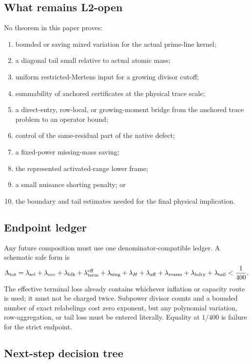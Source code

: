 \subsection{What remains L2-open}

No theorem in this paper proves:
\begin{enumerate}[label=\textup{(\arabic*)}]
 \item bounded or saving mixed variation for the actual prime-line kernel;
 \item a diagonal tail small relative to actual atomic mass;
 \item uniform restricted-Mertens input for a growing divisor cutoff;
 \item summability of anchored certificates at the physical trace scale;
 \item a direct-entry, row-local, or growing-moment bridge from the
 anchored trace problem to an operator bound;
 \item control of the same-residual part of the native defect;
 \item a fixed-power missing-mass saving;
 \item the represented activated-range lower frame;
 \item a small nuisance shorting penalty; or
 \item the boundary and tail estimates needed for the final physical
 implication.
\end{enumerate}

\subsection{Endpoint ledger}

Any future composition must use one denominator-compatible ledger.  A
schematic safe form is
\[
 \Lambda_{\rm tot}
 =
 \lambda_{\rm sel}+\lambda_{\rm occ}+\lambda_{\rm blk}
 +\lambda_{\rm term}^{\rm eff}
 +\lambda_{\rm sing}+\lambda_H+\lambda_{\rm aff}
 +\lambda_{\rm reasm}+\lambda_{\rm bdry}+\lambda_{\rm tail}
 <\frac1{400}.
\]
The effective terminal loss already contains whichever inflation or
capacity route is used; it must not be charged twice.  Subpower divisor
counts and a bounded number of exact relabelings cost zero exponent, but
any polynomial variation, row-aggregation, or tail loss must be entered
literally.  Equality at \(1/400\) is failure for the strict endpoint.

\subsection{Next-step decision tree}

